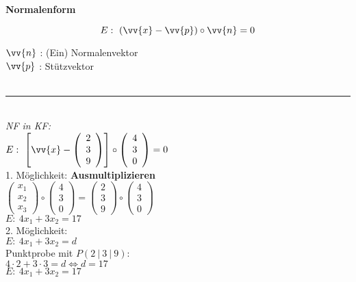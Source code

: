 \begin{minipage}[t]{0.49\textwidth}
    \textbf{Normalenform}

    $$E: \ (\vv{x} - \vv{p}) \circ \vv{n} = 0$$

    $\vv{n}$ : (Ein) Normalenvektor \\
    $\vv{p}$ : Stützvektor \\
    \\[3.75pt]
    \noindent\rule{\textwidth}{1pt} \\
    \textit{NF in KF:} \\

    $E: \ \left[\vv{x} - \left(\begin{array}{c}  2 \\ 3 \\ 9 \end{array}\right)\right] \circ \left(\begin{array}{c}  4 \\ 3 \\ 0 \end{array}\right) = 0$ \\

    1. Möglichkeit: \textbf{Ausmultiplizieren} \\
    $\left(\begin{array}{c}  x_1 \\ x_2 \\ x_3 \end{array}\right) \circ \left(\begin{array}{c}  4 \\ 3 \\ 0 \end{array}\right) = \left(\begin{array}{c}  2 \\ 3 \\ 9 \end{array}\right) \circ \left(\begin{array}{c}  4 \\ 3 \\ 0 \end{array}\right)$ \\
    
    $E: \ 4x_1 + 3x_2 = 17$ \\

    2. Möglichkeit: \\
    $E: \ 4x_1 + 3x_2 = d$ \\

    Punktprobe mit $P(2 \ | \ 3 \ | \ 9)$: \\
    $4\cdot2 + 3\cdot3 = d \Longleftrightarrow d = 17$\\
    $E: \ 4x_1 + 3x_2 = 17$ \\
\end{minipage}
